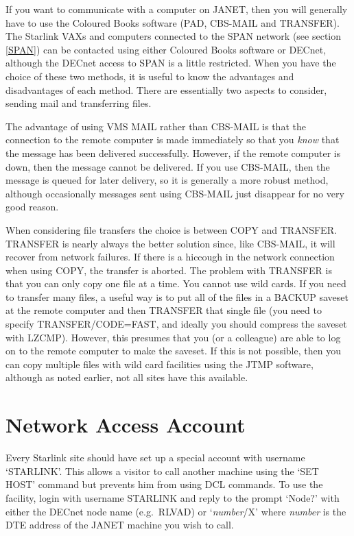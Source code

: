 If you want to communicate with a computer on JANET, then you will generally
have to use the Coloured Books software (PAD, CBS-MAIL and TRANSFER). The Starlink
VAXs and computers connected to the SPAN network (see section \ref{SPAN}) can
be contacted using either Coloured Books software or DECnet, although the
DECnet access to SPAN is a little restricted. When you have the choice of these
two methods, it is useful to know the advantages and disadvantages of each
method. There are essentially two aspects to consider, sending mail and
transferring files.

The advantage of using VMS MAIL rather than CBS-MAIL is that the connection to the
remote computer is made immediately so that you {\it know} that the message has
been delivered successfully. However, if the remote computer is down, then the
message cannot be delivered. If you use CBS-MAIL, then the message is queued for
later delivery, so it is generally a more robust method, although occasionally
messages sent using CBS-MAIL just disappear for no very good reason.

When considering file transfers the choice is between COPY and TRANSFER.
TRANSFER is nearly always the better solution since, like CBS-MAIL, it will
recover from network failures. If there is a hiccough in the network connection
when using COPY, the transfer is aborted. The problem with TRANSFER is that you
can only copy one file at a time. You cannot use wild cards. If you need to
transfer many files, a useful way is to put all of the files in a BACKUP
saveset at the remote computer and then TRANSFER that single file (you need to
specify TRANSFER/CODE=FAST, and ideally you should compress the saveset with
LZCMP). However, this presumes that you (or a colleague) are able to log on to
the remote computer to make the saveset. If this is not possible, then you can
copy multiple files with wild card facilities using the JTMP software,
although as noted earlier, not all sites have this available.


\section{Network Access Account}

Every Starlink site should have set up a special account with username
`STARLINK'. This allows a visitor to call another machine using the `SET HOST'
command but prevents him from using DCL commands. To use the facility, login
with username STARLINK and reply to the prompt `Node?' with either the DECnet
node name (e.g.\  RLVAD) or `{\em number}/X' where {\em number} is the DTE
address of the JANET machine you wish to call.

